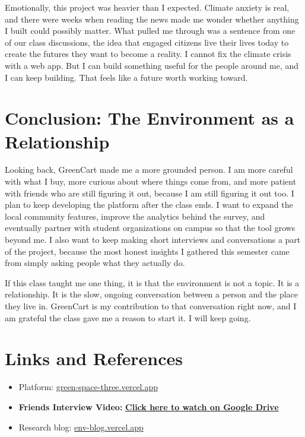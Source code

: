 \documentclass[12pt,letterpaper]{article}
\begin{document}
Emotionally, this project was heavier than I expected. Climate anxiety is real, and there were weeks when reading the news made me wonder whether anything I built could possibly matter. What pulled me through was a sentence from one of our class discussions, the idea that engaged citizens live their lives today to create the futures they want to become a reality. I cannot fix the climate crisis with a web app. But I can build something useful for the people around me, and I can keep building. That feels like a future worth working toward.

\section{Conclusion: The Environment as a Relationship}

Looking back, GreenCart made me a more grounded person. I am more careful with what I buy, more curious about where things come from, and more patient with friends who are still figuring it out, because I am still figuring it out too. I plan to keep developing the platform after the class ends. I want to expand the local community features, improve the analytics behind the survey, and eventually partner with student organizations on campus so that the tool grows beyond me. I also want to keep making short interviews and conversations a part of the project, because the most honest insights I gathered this semester came from simply asking people what they actually do.

If this class taught me one thing, it is that the environment is not a topic. It is a relationship. It is the slow, ongoing conversation between a person and the place they live in. GreenCart is my contribution to that conversation right now, and I am grateful the class gave me a reason to start it. I will keep going.

\section{Links and References}
\begin{itemize}[leftmargin=1.4em]
  \item Platform: \href{https://green-space-three.vercel.app/}{green-space-three.vercel.app}
  \item \textbf{Friends Interview Video:} \textbf{\href{https://drive.google.com/file/d/1zsL3ZT3G7_RAlRFDzOxFrsN9qzT7cJ12/view?usp=drive_link}{Click here to watch on Google Drive}}
  \item Research blog: \href{https://env-blog.vercel.app/}{env-blog.vercel.app}
\end{itemize}
\end{document}
